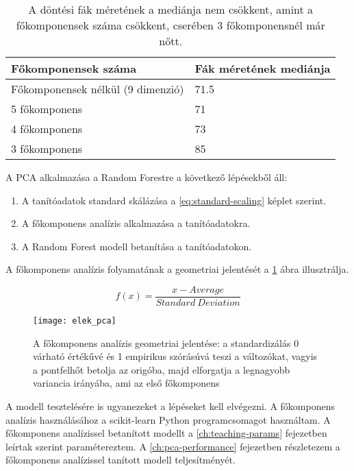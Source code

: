 \begin{table}[H]
	\centering
	\begin{tabular}{ | p{} | p{} | }
		\hline
		\textbf{Főkomponensek száma} & \textbf{Fák méretének mediánja} \\
		\hline \hline
		Főkomponensek nélkül (9 dimenzió) & 71.5 \\
		\hline
    5 főkomponens & 71 \\
		\hline
		4 főkomponens & 73\\
		\hline
    3 főkomponens & 85 \\
    \hline
	\end{tabular}
	\caption{A döntési fák méretének a mediánja nem csökkent, amint a főkomponensek száma csökkent, cserében 3 főkomponensnél már nőtt.}
	\label{tab:increase-in-model-size}
\end{table}

A PCA alkalmazása a Random Forestre a következő lépésekből áll:
\begin{enumerate}
	\item A tanítóadatok standard skálázása a \ref{eq:standard-scaling} képlet szerint.
	\item A főkomponens analízis alkalmazása a tanítóadatokra.
	\item A Random Forest modell betanítása a tanítóadatokon.
\end{enumerate}
A főkomponens analízis folyamatának a geometriai jelentését a \ref{fig:elek-pca} ábra illusztrálja.

\begin{equation}\label{eq:standard-scaling}
  f(x) = \frac{x - Average}{Standard \ Deviation}
\end{equation}

\begin{figure}[H]
	\centering
	\texttt{[image: elek\_pca]}
	\caption{A főkomponens analízis geometriai jelentése: a standardizálás 0 várható értékűvé és
  1 empirikus szórásúvá teszi a változókat, vagyis a pontfelhőt betolja az origóba,
  majd elforgatja a legnagyobb variancia irányába, ami az első főkomponens \cite{elek2011}}
    \label{fig:elek-pca}
\end{figure}

A modell tesztelésére is ugyanezeket a lépéseket kell elvégezni. A főkomponens analízis használásához a scikit-learn \cite{scikit-learn} Python programcsomagot használtam. A főkomponens analízissel betanított modellt a \ref{ch:teaching-params} fejezetben leírtak szerint paramétereztem. A \ref{ch:pca-performance} fejezetben részletezem a főkomponens analízissel tanított modell teljesítményét.

